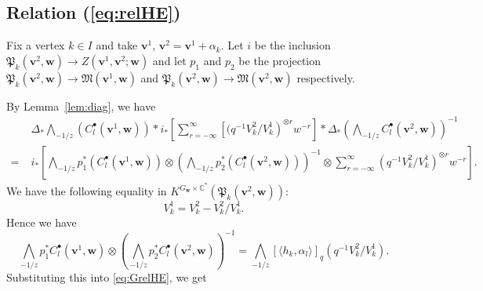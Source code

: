 \documentclass[12pt]{amsart}
\def\Bbb{\mathbb}
\def\frak{\mathfrak}
\theoremstyle{definition}
\theoremstyle{remark}
\numberwithin{equation}{subsection}
\newcommand{\lemref}[1]{Lemma~\ref{#1}}
\newcommand{\C}{{\Bbb C}}
\newcommand{\M}{{\frak M}} %
\newcommand{\bv}{{\mathbf v}} %
\newcommand{\bw}{{\mathbf w}} %
\newcommand{\Pa}{{\frak P}} %
\newcommand{\Wedge}{{\textstyle \bigwedge}}
\begin{document}
\subsection{Relation (\ref{eq:relHE})}

Fix a vertex $k\in I$ and take $\bv^1$, $\bv^2 = \bv^1+\alpha_k$.  Let
$i$ be the inclusion $\Pa_k(\bv^2,\bw)\to
Z(\bv^1,\bv^2;\bw)$ and let $p_1$ and $p_2$ be the projection
$\Pa_k(\bv^2,\bw)\to \M(\bv^1,\bw)$ and
$\Pa_k(\bv^2,\bw)\to \M(\bv^2,\bw)$ respectively.

By \lemref{lem:diag}, we have
\begin{equation}\label{eq:GrelHE}
\begin{split}
  & \Delta_* \Wedge_{-1/z}(C_l^\bullet(\bv^1,\bw))\ast
  i_{*} \left[\sum_{r=-\infty}^\infty
   \left[(q^{-1} V^2_k/V^1_k\right)^{\otimes r} w^{-r} \right]
  \ast \Delta_* \left(\Wedge_{-1/z} C_l^\bullet(\bv^2,\bw)\right)^{-1}\\ 
  =\; & i_* \left[\Wedge_{-1/z} p_1^*  (C_l^\bullet(\bv^1,\bw))\otimes
   \left(\Wedge_{-1/z} p_2^*  (C_l^\bullet(\bv^2,\bw))\right)^{-1}\otimes
   \sum_{r=-\infty}^\infty
           \left(q^{-1}V^2_k/V^1_k\right)^{\otimes r} w^{-r}\right].
\end{split}
\end{equation}
We have the following equality in $K^{G_\bw\times\C^*}(\Pa_k(\bv^2,\bw))$:
\begin{equation*}
   V_k^1 = V_k^2 - V_k^2/V_k^1.
\end{equation*}
Hence we have
\begin{equation*}
   \Wedge_{-1/z} p_1^* C_l^\bullet(\bv^1,\bw)\otimes
    \left(\Wedge_{-1/z} p_2^* C_l^\bullet(\bv^2,\bw)\right)^{-1}
   = 
      \Wedge_{-1/z} [\langle h_k,\alpha_l\rangle]_q
        \left(q^{-1}V^2_k/V^1_k\right).
\end{equation*}
Substituting this into \eqref{eq:GrelHE}, we get
\end{document}
